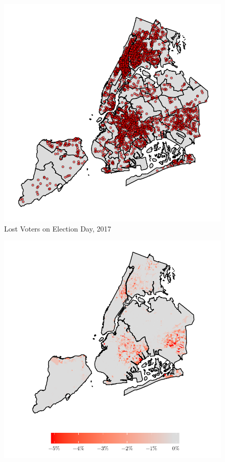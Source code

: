 \documentclass[
  12pt,
]{article}
\begin{document}
\begin{singlespace}
\begin{figure}[H]

{\centering \includegraphics{UAR_submission_files/figure-latex/citywide-map-1} 

}

\caption{\label{fig:citymap}Lost Voters on Election Day, 2017}\label{fig:citywide-map}
\end{figure}




\begin{figure}[H]

{\centering \includegraphics{UAR_submission_files/figure-latex/postest-map-1} 

}
\end{figure}
\end{singlespace}
\end{document}
